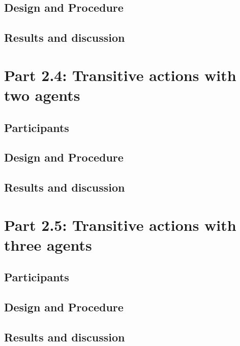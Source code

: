 \documentclass[man]{apa6}
\theoremstyle{definition}
\theoremstyle{definition}
\theoremstyle{definition}
\theoremstyle{remark}
\begin{document}
\subsection{Design and Procedure}\label{design-and-procedure-9}

\subsection{Results and discussion}\label{results-and-discussion-9}

\section{Part 2.4: Transitive actions with two
agents}\label{part-2.4-transitive-actions-with-two-agents}

\subsection{Participants}\label{participants-10}

\subsection{Design and Procedure}\label{design-and-procedure-10}

\subsection{Results and discussion}\label{results-and-discussion-10}

\section{Part 2.5: Transitive actions with three
agents}\label{part-2.5-transitive-actions-with-three-agents}

\subsection{Participants}\label{participants-11}

\subsection{Design and Procedure}\label{design-and-procedure-11}

\subsection{Results and discussion}\label{results-and-discussion-11}
\end{document}
